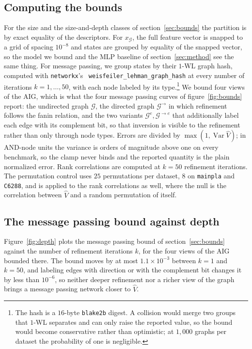 \documentclass{article}
\begin{document}
\subsection{Computing the bounds}\label{app:bounds}
For the size and the size-and-depth classes of section~\ref{sec:bounds} the partition is by exact equality of the descriptors.
For $x_\mathcal{G}$, the full feature vector is snapped to a grid of spacing $10^{-8}$ and states are grouped by equality of the snapped vector, so the model we bound and the MLP baseline of section~\ref{sec:method} see the same thing.
For message passing, we group states by their $1$-WL graph hash, computed with \texttt{networkx}'s~\cite{networkx} \texttt{weisfeiler\_lehman\_graph\_hash} at every number of iterations $k = 1, \dots, 50$, with each node labeled by its type.\footnote{The hash is a $16$-byte \texttt{blake2b} digest. A collision would merge two groups that $1$-WL separates and can only raise the reported value, so the bound would become conservative rather than optimistic; at $1{,}000$ graphs per dataset the probability of one is negligible.}
We bound four views of the AIG, which is what the four message passing curves of figure~\ref{fig:bounds} report: the undirected graph $\mathcal{G}$, the directed graph $\mathcal{G}^\rightarrow$ in which refinement follows the fanin relation, and the two variants $\mathcal{G}^e, \mathcal{G}^{\rightarrow e}$ that additionally label each edge with its complement bit, so that inversion is visible to the refinement rather than only through node types.
Errors are divided by $\max(1, \operatorname{Var}\widehat{V})$; in AND-node units the variance is orders of magnitude above one on every benchmark, so the clamp never binds and the reported quantity is the plain normalized error.
Rank correlations are computed at $k = 50$ refinement iterations.
The permutation control uses $25$ permutations per dataset, $8$ on \texttt{mainpla} and \texttt{C6288}, and is applied to the rank correlations as well, where the null is the correlation between $\widehat{V}$ and a random permutation of itself.

\subsection{The message passing bound against depth}\label{app:depth}
Figure~\ref{fig:depth} plots the message passing bound of section~\ref{sec:bounds} against the number of refinement iterations $k$, for the four views of the AIG bounded there.
The bound moves by at most $1.1\times10^{-3}$ between $k = 1$ and $k = 50$, and labeling edges with direction or with the complement bit changes it by less than $10^{-6}$, so neither deeper refinement nor a richer view of the graph brings a message passing network closer to $\widehat{V}$.
\end{document}
